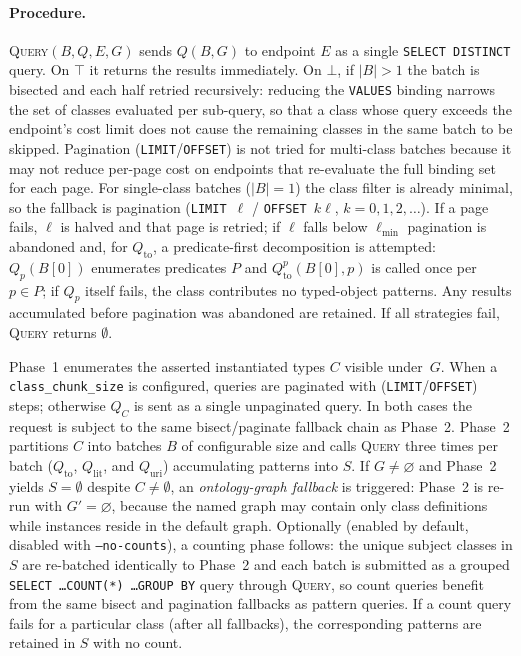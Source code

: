 \documentclass[12pt]{article}
\begin{document}
\paragraph*{Procedure.}
\textsc{Query}$(B, Q, E, G)$ sends $Q(B, G)$ to endpoint $E$ as a
single \texttt{SELECT DISTINCT} query.
On $\top$ it returns the results immediately.
On $\bot$, if $|B| > 1$ the batch is bisected and each half retried
recursively: reducing the \texttt{VALUES} binding narrows the set of
classes evaluated per sub-query, so that a class whose query exceeds
the endpoint's cost limit does not cause the remaining classes in the
same batch to be skipped.
Pagination (\texttt{LIMIT}/\texttt{OFFSET}) is not tried for
multi-class batches because it may not reduce per-page cost on
endpoints that re-evaluate the full binding set for each page.
For single-class batches ($|B|=1$) the class filter is already
minimal, so the fallback is pagination (\texttt{LIMIT $\ell$} /
\texttt{OFFSET $k\ell$}, $k = 0, 1, 2, \ldots$).
If a page fails, $\ell$ is halved and that page is retried; if $\ell$
falls below $\ell_{\min}$ pagination is abandoned and, for
$Q_\mathrm{to}$, a predicate-first decomposition is attempted:
$Q_p(B[0])$ enumerates predicates $P$ and
$Q_\mathrm{to}^p(B[0],p)$ is called once per $p \in P$; if $Q_p$
itself fails, the class contributes no typed-object patterns.
Any results accumulated before pagination was abandoned are retained.
If all strategies fail, \textsc{Query} returns $\emptyset$.

Phase~1 enumerates the asserted instantiated types $C$ visible
under~$G$.
When a \texttt{class\_chunk\_size} is configured, queries are
paginated with (\texttt{LIMIT}/\texttt{OFFSET}) steps; otherwise $Q_C$ is sent
as a single unpaginated query.
In both cases the request is subject to the same bisect/paginate
fallback chain as Phase~2.
Phase~2 partitions $C$ into batches $B$ of configurable size and
calls \textsc{Query} three times per batch ($Q_\mathrm{to}$,
$Q_\mathrm{lit}$, and $Q_\mathrm{uri}$) accumulating patterns into
$S$.
If $G \neq \varnothing$ and Phase~2 yields $S = \emptyset$ despite
$C \neq \emptyset$, an \emph{ontology-graph fallback} is triggered:
Phase~2 is re-run with $G' = \varnothing$, because the named graph
may contain only class definitions while instances reside in the
default graph. %
Optionally (enabled by default, disabled with \texttt{--no-counts}),
a counting phase follows: the unique subject classes in $S$ are
re-batched identically to Phase~2 and each batch is submitted as a
grouped \texttt{SELECT \ldots COUNT(*) \ldots GROUP BY} query through
\textsc{Query}, so count queries benefit from the same bisect and
pagination fallbacks as pattern queries.
If a count query fails for a particular class (after all fallbacks),
the corresponding patterns are retained in $S$ with no count.
\end{document}
